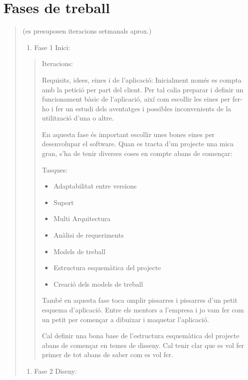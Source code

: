 \documentclass[letterpaper,11pt,catalan]{sphinxmanual}
\begin{document}
\section{Fases de treball}
\label{\detokenize{index:fases-de-treball}}\begin{quote}

(es presuposen iteracions setmanals aprox.)
\begin{enumerate}
\item {} 
Fase 1 Inici:

\end{enumerate}
\begin{quote}

Iteracions: 

Requisits, idees, eines i  de l'aplicació: Inicialment només es compta amb
la petició per part del client. Per tal calia preparar i definir un funcionament
bàsic de l'aplicació, així com escollir les eines per fer-ho i fer un estudi dels aventatges
i possibles inconvenients de la utilització d'una o altre.

En aquesta fase és important escollir unes bones eines per desenvolupar el software.
Quan es tracta d'un projecte una mica gran, s'ha de tenir diverses coses en compte
abans de començar:

Tasques:
\begin{itemize}
\item {} 
Adaptabilitat entre versions

\item {} 
Suport

\item {} 
Multi Arquitectura

\item {} 
Anàlisi de requeriments

\item {} 
Models de treball

\item {} 
Estructura esquemàtica del projecte

\item {} 
Creació dels models de treball

\end{itemize}

També en aquesta fase toca omplir pissarres i pissarres d'un petit esquema d'aplicació.
Entre els mentors a l'empresa i jo vam fer com un petit  per començar
a dibuixar i maquetar l'aplicació.

Cal definir una bona base de l'estructura esquemàtica del projecte abans de començar en
temes de disseny. Cal tenir clar que es vol fer primer de tot abans de saber com es vol
fer.
\end{quote}
\begin{enumerate}
\item {} 
Fase 2 Diseny:


\end{enumerate}
\end{quote}
\end{document}
